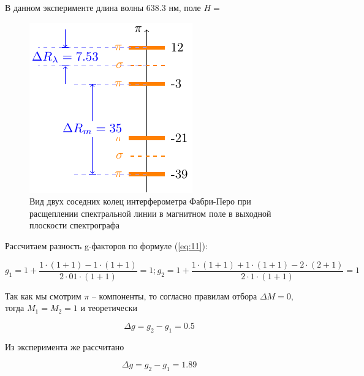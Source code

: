 В данном эксперименте длина волны 638.3 нм, поле $H=$
\begin{figure}[h!]
	\centering
	\includegraphics[scale=1]{ris/4b}
	\caption{Вид двух соседних колец интерферометра Фабри-Перо при расщеплении спектральной линии в магнитном поле в выходной плоскости спектрографа}
	\label{fig:ris4b}
\end{figure}

Рассчитаем разность g-факторов по формуле (\ref{eq:11}):

\begin{equation}
g_{1}=1+\frac{1\cdot(1+1)-1\cdot(1+1)}{2\cdot01\cdot(1+1)}=1; g_{2}=1+\frac{1\cdot(1+1)+1\cdot(1+1)-2\cdot(2+1)}{2\cdot1\cdot(1+1)}=1
\end{equation}

Так как мы смотрим $\pi$ -- компоненты, то согласно правилам отбора $\Delta M=0$, тогда $M_1=M_2=1$ и теоретически

\begin{equation}
	\Delta g=g_2-g_1=0.5
\end{equation}

Из эксперимента же рассчитано

\begin{equation}
	\Delta g=g_2-g_1=1.89
\end{equation}

